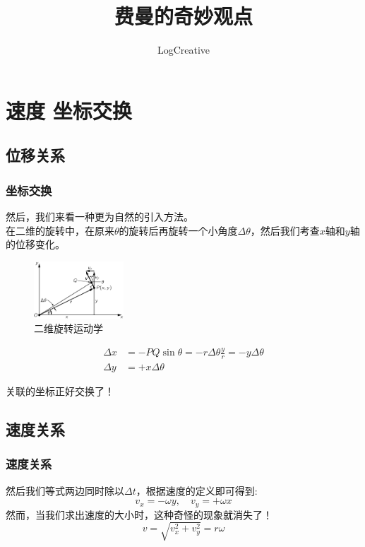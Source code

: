 %

    \title{费曼的奇妙观点}
    \author{LogCreative}

    \maketitle

    

\section{速度 坐标交换}
\subsection[位移关系]{位移关系}
    \begin{frame}
        \frametitle{坐标交换}
        然后，我们来看一种更为自然的引入方法。\\
        在二维的旋转中，在原来$\theta$的旋转后再旋转一个小角度$\Delta\theta$，然后我们考查$x$轴和$y$轴的位移变化。
    \begin{figure}
    \centering
    \includegraphics[width=0.3\textwidth]{pic1.png}
    \caption{二维旋转运动学}
    \end{figure}
    \begin{align}
    \Delta x&=-PQ \sin\theta=-r\Delta\theta \frac{y}{r}=-y\Delta\theta \\
    \Delta y&=+x\Delta\theta
    \end{align}

    关联的坐标正好交换了！
    \end{frame}

\subsection{速度关系}
    \begin{frame}
    \frametitle{速度关系}
    然后我们等式两边同时除以$\Delta t$，根据速度的定义即可得到:
    \begin{equation}
        v_x=-\omega y,\quad  v_y=+\omega x
    \end{equation}
    然而，当我们求出速度的大小时，这种奇怪的现象就消失了！
    \begin{equation}
    v=\sqrt{v_x^2+v_y^2}=r\omega
    \end{equation}
    \end{frame}

